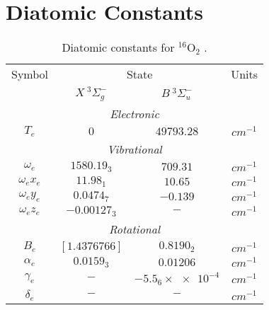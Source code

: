 \documentclass[11pt, twoside, fleqn]{report}
\begin{document}
\appendix
\chapter{Diatomic Constants}
\label{a:diatomic_constants}

\begin{table}[H]
    \centering
    \caption{Diatomic constants for $^{16}\mathrm{O}_2$ \cite{nist:diatomic}.}
    \label{t:diatomic_constants_for_o2}
    \begin{tabular}{cccc}
        \toprule
        Symbol        & \multicolumn{2}{c}{State} & Units                                      \\
        \cmidrule(lr){2-3}
                      & $X~^3\Sigma_g^-$          & $B~^3\Sigma_u^-$        &                  \\
        \midrule
        \multicolumn{4}{c}{\textit{Electronic}}                                                \\
        \cmidrule(lr){1-4}
        $T_e$         & $0$                       & $49793.28$              & $\unit{cm^{-1}}$ \\
        \multicolumn{4}{c}{\textit{Vibrational}}                                               \\
        \cmidrule(lr){1-4}
        $\omega_e$    & $1580.19_3$               & $709.31$                & $\unit{cm^{-1}}$ \\
        $\omega_ex_e$ & $11.98_1$                 & $10.65$                 & $\unit{cm^{-1}}$ \\
        $\omega_ey_e$ & $0.0474_7$                & $-0.139$                & $\unit{cm^{-1}}$ \\
        $\omega_ez_e$ & $-0.00127_3$              & $-$                     & $\unit{cm^{-1}}$ \\
        \multicolumn{4}{c}{\textit{Rotational}}                                                \\
        \cmidrule(lr){1-4}
        $B_e$         & $[1.4376766]$             & $0.8190_2$              & $\unit{cm^{-1}}$ \\
        $\alpha_e$    & $0.0159_3$                & $0.01206$               & $\unit{cm^{-1}}$ \\
        $\gamma_e$    & $-$                       & $-5.5_6\times\num{e-4}$ & $\unit{cm^{-1}}$ \\
        $\delta_e$    & $-$                       & $-$                     & $\unit{cm^{-1}}$ \\

\end{tabular}
\end{table}
\end{document}
